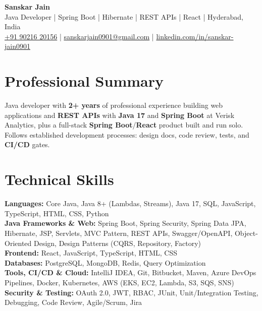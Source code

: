 \documentclass[a4paper,10pt]{article}
\begin{document}
\begin{center}
    {\LARGE \textbf{Sanskar Jain}} \\
    \vspace{2pt}
    Java Developer \;|\; Spring Boot \;|\; Hibernate \;|\; REST APIs \;|\; React \;|\; Hyderabad, India \\
    \vspace{2pt}
    \href{tel:+919021620156}{+91 90216 20156} \;|\;
    \href{mailto:sanskarjain0901@gmail.com}{sanskarjain0901@gmail.com} \;|\;
    \href{https://www.linkedin.com/in/sanskar-jain0901/}{linkedin.com/in/sanskar-jain0901}
\end{center}

\section*{Professional Summary}
Java developer with \textbf{2+ years} of professional experience building web applications and \textbf{REST APIs} with \textbf{Java 17} and \textbf{Spring Boot} at Verisk Analytics, plus a full-stack \textbf{Spring Boot}/\textbf{React} product built and run solo. Follows established development processes: design docs, code review, tests, and \textbf{CI/CD} gates.

\section*{Technical Skills}
\begin{sloppypar}
\noindent
\textbf{Languages:} Core Java, Java 8+ (Lambdas, Streams), Java 17, SQL, JavaScript, TypeScript, HTML, CSS, Python \\
\textbf{Java Frameworks \& Web:} Spring Boot, Spring Security, Spring Data JPA, Hibernate, JSP, Servlets, MVC Pattern, REST APIs, Swagger/OpenAPI, Object-Oriented Design, Design Patterns (CQRS, Repository, Factory) \\
\textbf{Frontend:} React, JavaScript, TypeScript, HTML, CSS \\
\textbf{Databases:} PostgreSQL, MongoDB, Redis, Query Optimization \\
\textbf{Tools, CI/CD \& Cloud:} IntelliJ IDEA, Git, Bitbucket, Maven, Azure DevOps Pipelines, Docker, Kubernetes, AWS (EKS, EC2, Lambda, S3, SQS, SNS) \\
\textbf{Security \& Testing:} OAuth 2.0, JWT, RBAC, JUnit, Unit/Integration Testing, Debugging, Code Review, Agile/Scrum, Jira
\end{sloppypar}
\end{document}
